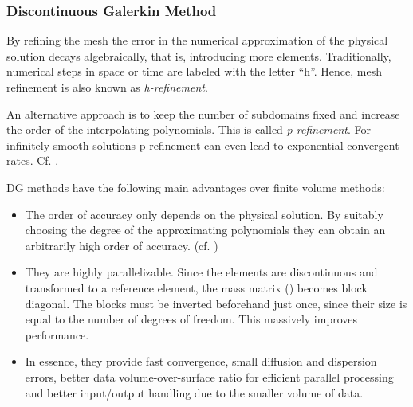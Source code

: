 \subsubsection{Discontinuous Galerkin Method}
\label{sec:polyonome-ansatz}

By refining the mesh the error in the numerical approximation of the physical
solution decays algebraically, that is, introducing more elements.
Traditionally, numerical steps in space or time are labeled with the letter
``h''. Hence, mesh refinement is also known as \emph{h-refinement}.




An alternative approach is to keep the number of subdomains fixed and increase
the order of the interpolating polynomials. This is called \emph{p-refinement}.
For infinitely smooth solutions p-refinement can even lead to exponential
convergent rates. Cf. \cite{tugnoli2016locally}.

DG methods have the following main advantages over finite volume methods:
\begin{itemize}
\item The order of accuracy only depends on the physical solution. By suitably
choosing the degree of the approximating polynomials they can obtain an
arbitrarily high order of accuracy. (cf. \cite{yu2013accuracy})

\item They are highly parallelizable. Since the elements are discontinuous and
transformed to a reference element, the mass matrix () becomes
block diagonal. The blocks must be inverted beforehand just once, since their
size is equal to the number of degrees of freedom. This massively improves
performance.



\item In essence, they provide fast convergence, small diffusion and dispersion
errors, better data volume-over-surface ratio for efficient parallel processing
and better input/output handling due to the smaller volume of data.
\end{itemize}

